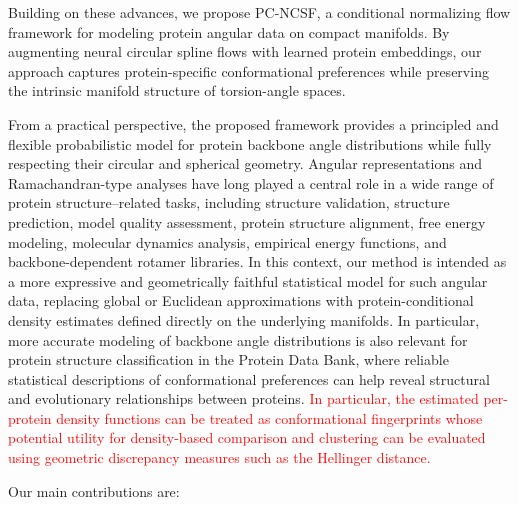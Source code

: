 \documentclass{article}
\begin{document}
Building on these advances, we propose PC-NCSF, a conditional normalizing flow framework for modeling protein angular data on compact manifolds. By augmenting neural circular spline flows with learned protein embeddings, our approach captures protein-specific conformational preferences while preserving the intrinsic manifold structure of torsion-angle spaces.

From a practical perspective, the proposed framework provides a principled and flexible probabilistic model for protein backbone angle distributions while fully respecting their circular and spherical geometry. Angular representations and Ramachandran-type analyses have long played a central role in a wide range of protein structure–related tasks, including structure validation, structure prediction, model quality assessment, protein structure alignment, free energy modeling, molecular dynamics analysis, empirical energy functions, and backbone-dependent rotamer libraries. In this context, our method is intended as a more expressive and geometrically faithful statistical model for such angular data, replacing global or Euclidean approximations with protein-conditional density estimates defined directly on the underlying manifolds. In particular, more accurate modeling of backbone angle distributions is also relevant for protein structure classification in the Protein Data Bank, where reliable statistical descriptions of conformational preferences can help reveal structural and evolutionary relationships between proteins. \textcolor{red}{In particular, the estimated per-protein density functions
can be treated as conformational fingerprints whose potential utility for
density-based comparison and clustering can be evaluated using geometric
discrepancy measures such as the Hellinger distance.}


Our main contributions are:
\end{document}

